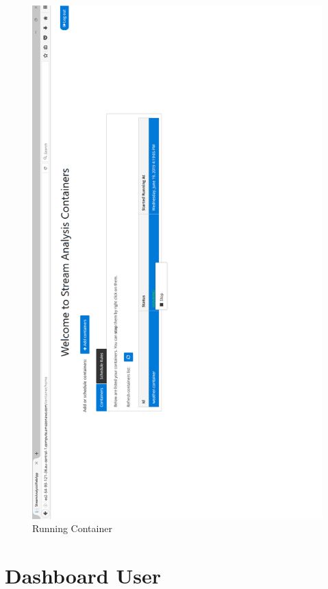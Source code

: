 \begin{figure}[p]
	\centering
	\noindent
	\includegraphics[width=0.5\paperwidth]{./images/guide/container/runningContainer.PNG}
	\caption{Running Container}
	\label{fig:runningContainer}
\end{figure}

\newpage

\section{Dashboard User}
\label{chap:05:02}


